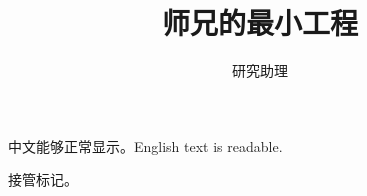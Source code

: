 \documentclass[UTF8,fontset=fandol,a4paper,11pt]{ctexart}
\title{师兄的最小工程}
\author{研究助理}
\date{}
\begin{document}
\maketitle
中文能够正常显示。English text is readable.

接管标记。
\end{document}

